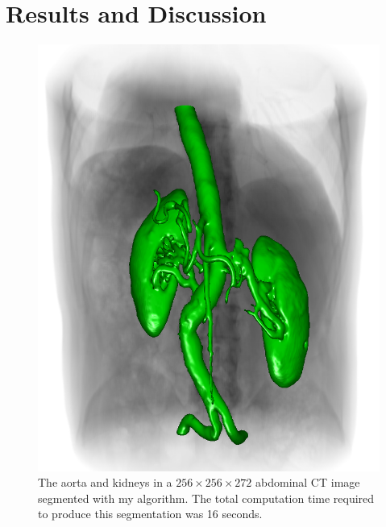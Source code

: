 \section{Results and Discussion}

\begin{figure}[t]
\centering
\includegraphics[width=6.0in]{figures/Aorta-3D.png}
\caption{The aorta and kidneys in a $256 \times 256 \times 272$ abdominal CT image segmented with my algorithm. The total computation time required to produce this segmentation was 16 seconds.}
\label{fig:aorta}
\end{figure}

